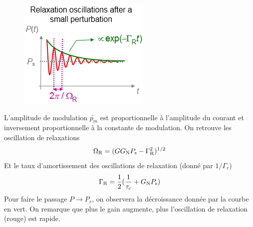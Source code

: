 	\begin{figure}
	\vspace{-5mm}
	\includegraphics[scale=0.7]{ch4/image24}
	\end{figure}
L'amplitude de modulation $\tilde{p_m}$ est proportionnelle à l'amplitude du courant et inversement
proportionnelle à la constante de modulation. On retrouve les oscillation de relaxations
\begin{equation}
{\Omega _{\rm{R}}} = {(G{G_{\rm{N}}}{P_{\rm{s}}} - \Gamma _{\rm{R}}^2)^{1/2}}
\end{equation}
Et le taux d'amortissement des oscillations de relaxation (donné par $1/\Gamma_r$)
\begin{equation}
{\Gamma _{\rm{R}}} = \frac{1}{2}(\frac{1}{{{\tau _{\rm{c}}}}} + {G_{\rm{N}}}{P_{\rm{s}}})
\end{equation}
Pour faire le passage $P\to P_s$, on observera la décroissance donnée par la courbe en vert. On 
remarque que plus le gain augmente, plus l'oscillation de relaxation (rouge) est rapide.\\

